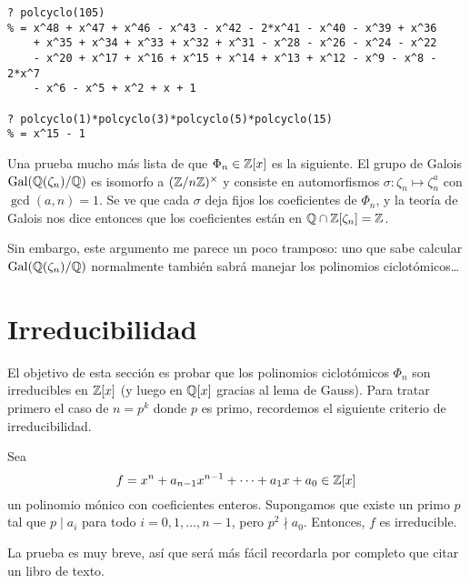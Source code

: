 \begin{shaded}
\begin{verbatim}
? polcyclo(105)
% = x^48 + x^47 + x^46 - x^43 - x^42 - 2*x^41 - x^40 - x^39 + x^36
    + x^35 + x^34 + x^33 + x^32 + x^31 - x^28 - x^26 - x^24 - x^22
    - x^20 + x^17 + x^16 + x^15 + x^14 + x^13 + x^12 - x^9 - x^8 - 2*x^7
    - x^6 - x^5 + x^2 + x + 1

? polcyclo(1)*polcyclo(3)*polcyclo(5)*polcyclo(15)
% = x^15 - 1
\end{verbatim}
\end{shaded}

\begin{comentario}
  Una prueba mucho más lista de que $\Phi_n \in \mathbb{Z} [x]$ es la siguiente.
  El grupo de Galois $\operatorname{Gal} (\mathbb{Q} (\zeta_n)/\mathbb{Q})$ es isomorfo a
  $(\mathbb{Z}/n\mathbb{Z})^\times$ y consiste en automorfismos
  $\sigma\colon \zeta_n \mapsto \zeta_n^a$ con $\gcd (a,n) = 1$. Se ve que cada
  $\sigma$ deja fijos los coeficientes de $\Phi_n$, y la teoría de Galois nos
  dice entonces que los coeficientes están en $\mathbb{Q} \cap \mathbb{Z} [\zeta_n] = \mathbb{Z}$.

  Sin embargo, este argumento me parece un poco tramposo: uno que sabe calcular
  $\operatorname{Gal} (\mathbb{Q} (\zeta_n)/\mathbb{Q})$ normalmente también sabrá manejar los polinomios
  ciclotómicos\dots
\end{comentario}


\section{Irreducibilidad}

El objetivo de esta sección es probar que los polinomios ciclotómicos $\Phi_n$
son irreducibles en $\mathbb{Z} [x]$ (y luego en $\mathbb{Q} [x]$ gracias al lema de
Gauss). Para tratar primero el caso de $n = p^k$ donde $p$ es primo, recordemos
el siguiente criterio de irreducibilidad.

\begin{proposicion}[Eisenstein]
  Sea
  $$f = x^n + a_{n-1} x^{n-1} + \cdots + a_1 x + a_0 \in \mathbb{Z} [x]$$
  un polinomio mónico con coeficientes enteros. Supongamos que existe un primo
  $p$ tal que $p \mid a_i$ para todo $i = 0,1,\ldots,n-1$, pero $p^2 \nmid
  a_0$. Entonces, $f$ es irreducible.
\end{proposicion}

La prueba es muy breve, así que será más fácil recordarla por completo que citar
un libro de texto.

